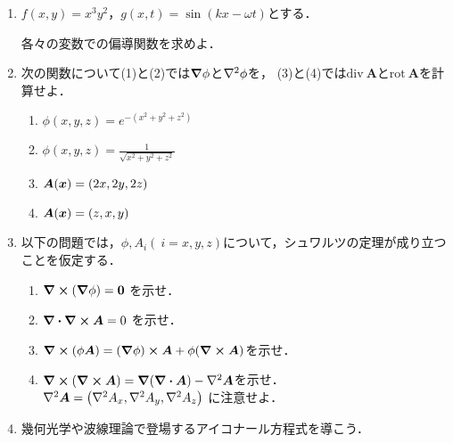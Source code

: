 \documentclass[dvipdfmx,a4j,11pt]{jsarticle}
\theoremstyle{mystyle}
\begin{document}
\begin{enumerate}[1.]
   \item    $f(x,y)=x^3y^2$，$g(x,t)=\sin (kx-\omega t)$とする．
   
   各々の変数での偏導関数を求めよ．

   \item 次の関数について(1)と(2)では$\grad \phi$と$\laplacian \phi$を，
         (3)と(4)では$\text{div}\ \bm{A}$と$\text{rot}\ \bm{A}$を計算せよ．
         \begin{enumerate}[(1)]
            \item $\phi(x,y,z)=e^{-(x^2+y^2+z^2)}$
            \item $\phi(x,y,z)=\frac{1}{\sqrt{x^2+y^2+z^2}}$
            \item $\bm{A}(\bm{x})=\qty(2x,2y,2z)$
            \item $\bm{A}(\bm{x})=\qty(z,x,y)$
         \end{enumerate}
         
         \vspace{1.0cm}

   \item 以下の問題では，$\phi,A_i(\ i=x,y,z)$について，シュワルツの定理が成り立つことを仮定する．
         \begin{enumerate}[(1)]
            \item $\curl{(\grad \phi)}=\vb{0}$ を示せ．
            \item $\div{\curl \vb*{A}}=0$ を示せ．
            \item $\curl{(\phi \vb*{A})}=
                     (\grad{\phi})\cross \vb*{A}+\phi(\curl{\vb*{A}})$を示せ．
            \item $\curl{(\curl{\vb*{A}})}=
                     \grad{(\div{\vb*{A}})}-\laplacian{\vb*{A}}$を示せ．
                  $\laplacian{\vb*{A}}=\qty(\laplacian{A_x},\laplacian{A_y},\laplacian{A_z})$
                  に注意せよ．
         \end{enumerate}

         \vspace{1.0cm}
   \item 幾何光学や波線理論で登場するアイコナール方程式を導こう．


\end{enumerate}
\end{document}
